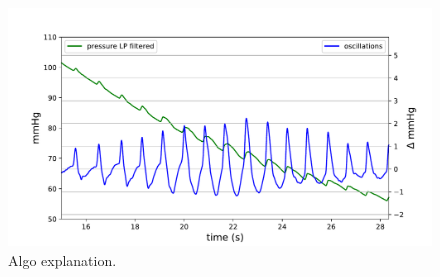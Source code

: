 \begin{figure}[ht]
\centering
\includegraphics[width=\textwidth]{figures/algo_detail.pdf}
\caption{Algo explanation.}
\label{fig:algoDetail}
\end{figure}
